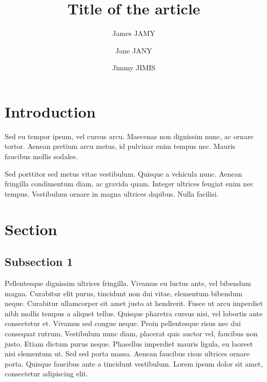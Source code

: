 \documentclass{jimis-en}
\title{Title of the article}
\author[1]{James JAMY}
\author[2]{Jane JANY}
\author[*1,2]{Jimmy JIMIS}
\affil[1]{University One, Country A}
\affil[2]{University Two, Country B}
\begin{document}
\maketitle



\section{Introduction}

\strut
\vspace{-4ex}

Sed eu tempor ipsum, vel cursus arcu. Maecenas non dignissim nunc, ac ornare tortor. Aenean
pretium arcu metus, id pulvinar enim tempus nec. Mauris faucibus mollis sodales. 

Sed porttitor sed metus vitae vestibulum. Quisque a vehicula nunc. Aenean fringilla condimentum
diam, ac gravida quam. Integer ultrices feugiat enim nec tempus. Vestibulum ornare in magna
ultrices dapibus. Nulla facilisi. 

\section{Section}

\subsection{Subsection 1}
Pellentesque dignissim ultrices fringilla. Vivamus eu luctus ante, vel bibendum magna.
Curabitur elit purus, tincidunt non dui vitae, elementum bibendum neque. Curabitur
ullamcorper sit amet justo at hendrerit. Fusce ut arcu imperdiet nibh mollis tempus a aliquet
tellus. Quisque pharetra cursus nisi, vel lobortis ante consectetur et. Vivamus sed congue
neque. Proin pellentesque risus nec dui consequat rutrum. Vestibulum nunc diam, placerat
quis auctor vel, faucibus non justo. Etiam dictum purus neque. Phasellus imperdiet mauris
ligula, eu laoreet nisi elementum ut. Sed sed porta massa. Aenean faucibus risus ultrices
ornare porta. Quisque faucibus ante a tincidunt vestibulum. Lorem ipsum dolor sit amet,
consectetur adipiscing elit.
\end{document}

